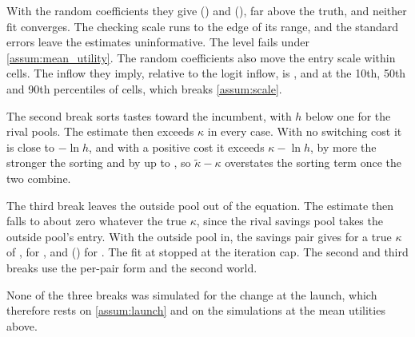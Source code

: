 With the random coefficients they give  () and  (), far above the truth, and neither fit converges. The checking scale runs to the edge of its range, and the standard errors leave the estimates uninformative. The level fails under \ref{assum:mean_utility}. The random coefficients also move the entry scale within cells. The inflow they imply, relative to the logit inflow, is ,  and  at the 10th, 50th and 90th percentiles of cells, which breaks \ref{assum:scale}.

The second break sorts tastes toward the incumbent, with $h$ below one for the rival pools. The estimate then exceeds $\kappa$ in every case. With no switching cost it is close to $-\ln h$, and with a positive cost it exceeds $\kappa-\ln h$, by more the stronger the sorting and by up to , so $\tilde{\kappa}-\kappa$ overstates the sorting term once the two combine.

The third break leaves the outside pool out of the equation. The estimate then falls to about zero whatever the true $\kappa$, since the rival savings pool takes the outside pool's entry. With the outside pool in, the savings pair gives  for a true $\kappa$ of ,  for , and  () for . The fit at  stopped at the iteration cap. The second and third breaks use the per-pair form and the second world.

None of the three breaks was simulated for the change at the launch, which therefore rests on \ref{assum:launch} and on the simulations at the mean utilities above.

